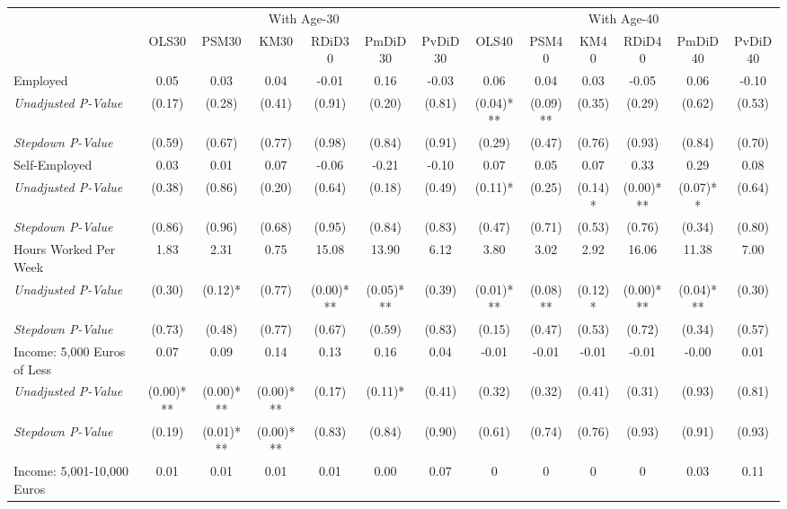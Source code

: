 \begin{tabular}{l c c c c c c c c c c c c}
\toprule
& \multicolumn{6}{c}{With Age-30} & \multicolumn{6}{c}{With Age-40} \\\cmidrule(lr){2-7} \cmidrule(lr){8-13}
 & OLS30 & PSM30 & KM30 & RDiD30 & PmDiD30 & PvDiD30 & OLS40 & PSM40 & KM40 & RDiD40 & PmDiD40 & PvDiD40 \\
\midrule
Employed & 0.05 & 0.03 & 0.04 & -0.01 & 0.16 & -0.03 & 0.06 & 0.04 & 0.03 & -0.05 & 0.06 & -0.10 \\
\quad \textit{Unadjusted P-Value} & (0.17) & (0.28) & (0.41) & (0.91) & (0.20) & (0.81) & (0.04)*** & (0.09)** & (0.35) & (0.29) & (0.62) & (0.53) \\
\quad \textit{Stepdown P-Value} & (0.59) & (0.67) & (0.77) & (0.98) & (0.84) & (0.91) & (0.29) & (0.47) & (0.76) & (0.93) & (0.84) & (0.70) \\
Self-Employed & 0.03 & 0.01 & 0.07 & -0.06 & -0.21 & -0.10 & 0.07 & 0.05 & 0.07 & 0.33 & 0.29 & 0.08 \\
\quad \textit{Unadjusted P-Value} & (0.38) & (0.86) & (0.20) & (0.64) & (0.18) & (0.49) & (0.11)* & (0.25) & (0.14)* & (0.00)*** & (0.07)** & (0.64) \\
\quad \textit{Stepdown P-Value} & (0.86) & (0.96) & (0.68) & (0.95) & (0.84) & (0.83) & (0.47) & (0.71) & (0.53) & (0.76) & (0.34) & (0.80) \\
Hours Worked Per Week & 1.83 & 2.31 & 0.75 & 15.08 & 13.90 & 6.12 & 3.80 & 3.02 & 2.92 & 16.06 & 11.38 & 7.00 \\
\quad \textit{Unadjusted P-Value} & (0.30) & (0.12)* & (0.77) & (0.00)*** & (0.05)*** & (0.39) & (0.01)*** & (0.08)** & (0.12)* & (0.00)*** & (0.04)*** & (0.30) \\
\quad \textit{Stepdown P-Value} & (0.73) & (0.48) & (0.77) & (0.67) & (0.59) & (0.83) & (0.15) & (0.47) & (0.53) & (0.72) & (0.34) & (0.57) \\
Income: 5,000 Euros of Less & 0.07 & 0.09 & 0.14 & 0.13 & 0.16 & 0.04 & -0.01 & -0.01 & -0.01 & -0.01 & -0.00 & 0.01 \\
\quad \textit{Unadjusted P-Value} & (0.00)*** & (0.00)*** & (0.00)*** & (0.17) & (0.11)* & (0.41) & (0.32) & (0.32) & (0.41) & (0.31) & (0.93) & (0.81) \\
\quad \textit{Stepdown P-Value} & (0.19) & (0.01)*** & (0.00)*** & (0.83) & (0.84) & (0.90) & (0.61) & (0.74) & (0.76) & (0.93) & (0.91) & (0.93) \\
Income: 5,001-10,000 Euros & 0.01 & 0.01 & 0.01 & 0.01 & 0.00 & 0.07 & 0 & 0 & 0 & 0 & 0.03 & 0.11 \\

\end{tabular}
